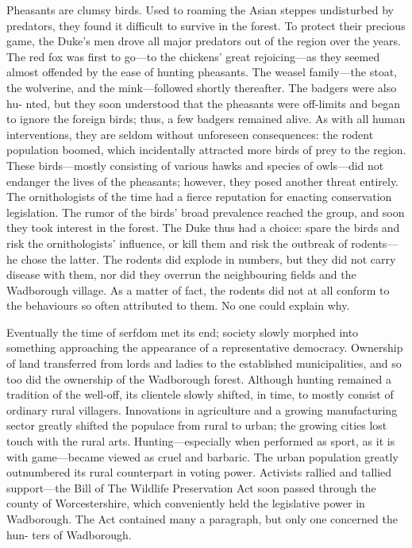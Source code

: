 Pheasants are clumsy birds.
Used to roaming the Asian steppes undisturbed by predators, they found it difficult to survive in the forest.
To protect their precious game, the Duke's men drove all major predators out of the region over the years.
The red fox was first to go---to the chickens' great rejoicing---as they seemed almost offended by the ease of hunting pheasants.
The weasel family---the stoat, the wolverine, and the mink---followed shortly thereafter.
The badgers were also hu- nted, but they soon understood that the pheasants were off-limits and began to ignore the foreign birds; thus, a few badgers remained alive.
As with all human interventions, they are seldom without unforeseen consequences: the rodent population boomed, which incidentally attracted more birds of prey to the region.
These birds---mostly consisting of various hawks and species of owls---did not endanger the lives of the pheasants; however, they posed another threat entirely.
The ornithologists of the time had a fierce reputation for enacting conservation legislation.
The rumor of the birds' broad prevalence reached the group, and soon they took interest in the forest.
The Duke thus had a choice: spare the birds and risk the ornithologists' influence, or kill them and risk the outbreak of rodents---he chose the latter.
The rodents did explode in numbers, but they did not carry disease with them, nor did they overrun the neighbouring fields and the Wadborough village.
As a matter of fact, the rodents did not at all conform to the behaviours so often attributed to them.
No one could explain why.

Eventually the time of serfdom met its end; society slowly morphed into something approaching the appearance of a representative democracy.
Ownership of land transferred from lords and ladies to the established municipalities, and so too did the ownership of the Wadborough forest.
Although hunting remained a tradition of the well-off, its clientele slowly shifted, in time, to mostly consist of ordinary rural villagers.
Innovations in agriculture and a growing manufacturing sector greatly shifted the populace from rural to urban; the growing cities lost touch with the rural arts.
Hunting---especially when performed as sport, as it is with game---became viewed as cruel and barbaric.
The urban population greatly outnumbered its rural counterpart in voting power.
Activists rallied and tallied support---the Bill of The Wildlife Preservation Act soon passed through the county of Worcestershire, which conveniently held the legislative power in Wadborough.
The Act contained many a paragraph, but only one concerned the hun- ters of Wadborough.

